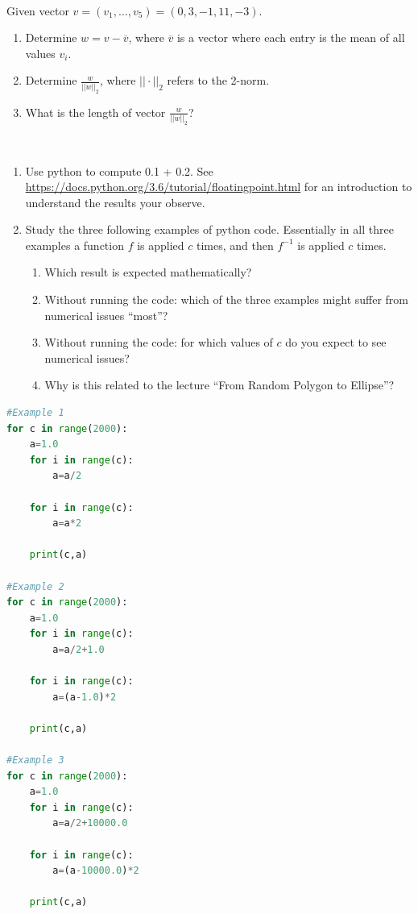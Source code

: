 \documentclass[10pt]{article}
\begin{document}
\\
 Given vector $v=(v_1, \ldots, v_5) = (0,3,-1,11,-3)$.
\begin{enumerate}
\item Determine $w=v-\overline{v}$, where $\overline{v}$ is a
  vector where each entry is the mean of all values $v_i$.
\item Determine $\frac{w}{||w||_2}$, where $||\cdot||_2$ refers to the 2-norm.
\item What is the length of vector $\frac{w}{||w||_2}$?
\end{enumerate}

\\
\begin{enumerate}
\item Use python to compute 0.1 + 0.2. See
  \url{https://docs.python.org/3.6/tutorial/floatingpoint.html} for an
  introduction to understand the results your observe.
\item Study the three following examples of python code. Essentially in all
three examples a function $f$ is applied $c$ times, and then $f^{-1}$
is applied $c$ times.
\begin{enumerate}
\item Which result is expected mathematically?
\item Without running the code: which of the three examples might
  suffer from numerical issues ``most''?
\item Without running the code: for which values of $c$ do you expect
  to see numerical issues? 
\item Why is this related to the lecture ``From Random
  Polygon to Ellipse''?
\end{enumerate}
\end{enumerate}
\newpage
\begin{lstlisting}[language=Python]
#Example 1
for c in range(2000):
    a=1.0
    for i in range(c):
        a=a/2
    
    for i in range(c):
        a=a*2
    
    print(c,a)

#Example 2
for c in range(2000):
    a=1.0
    for i in range(c):
        a=a/2+1.0
    
    for i in range(c):
        a=(a-1.0)*2
    
    print(c,a)

#Example 3
for c in range(2000):
    a=1.0
    for i in range(c):
        a=a/2+10000.0
    
    for i in range(c):
        a=(a-10000.0)*2
    
    print(c,a)
\end{lstlisting}
\end{document}
